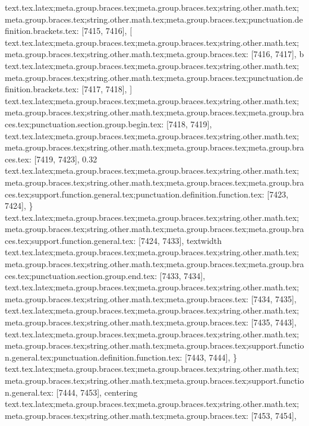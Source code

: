 {{{{{{{{{{{{{{{{{{{{{{{{{{{{{{{{{{{{{{{{{{{{{{{{{{{{{{{{{{{{{{{{{{{{{{{{{{{{{{{{{{{{{{{{{{{{{{{{{{{{{{{{{{{{{{{{{{{{{{{{{{{{{{{{{{{{{{{{{{{{{{{{{{{{{{{{{{{{{{{{{{{{{{{{{{{{{{{{{{{{{{{{{{{{{{{{{{{{{{{{text.tex.latex;meta.group.braces.tex;meta.group.braces.tex;string.other.math.tex;meta.group.braces.tex;string.other.math.tex;meta.group.braces.tex;punctuation.definition.brackets.tex: [7415, 7416], {[}
text.tex.latex;meta.group.braces.tex;meta.group.braces.tex;string.other.math.tex;meta.group.braces.tex;string.other.math.tex;meta.group.braces.tex: [7416, 7417], {b}
text.tex.latex;meta.group.braces.tex;meta.group.braces.tex;string.other.math.tex;meta.group.braces.tex;string.other.math.tex;meta.group.braces.tex;punctuation.definition.brackets.tex: [7417, 7418], {]}
text.tex.latex;meta.group.braces.tex;meta.group.braces.tex;string.other.math.tex;meta.group.braces.tex;string.other.math.tex;meta.group.braces.tex;meta.group.braces.tex;punctuation.section.group.begin.tex: [7418, 7419], {{}
text.tex.latex;meta.group.braces.tex;meta.group.braces.tex;string.other.math.tex;meta.group.braces.tex;string.other.math.tex;meta.group.braces.tex;meta.group.braces.tex: [7419, 7423], {0.32}
text.tex.latex;meta.group.braces.tex;meta.group.braces.tex;string.other.math.tex;meta.group.braces.tex;string.other.math.tex;meta.group.braces.tex;meta.group.braces.tex;support.function.general.tex;punctuation.definition.function.tex: [7423, 7424], {\}
text.tex.latex;meta.group.braces.tex;meta.group.braces.tex;string.other.math.tex;meta.group.braces.tex;string.other.math.tex;meta.group.braces.tex;meta.group.braces.tex;support.function.general.tex: [7424, 7433], {textwidth}
text.tex.latex;meta.group.braces.tex;meta.group.braces.tex;string.other.math.tex;meta.group.braces.tex;string.other.math.tex;meta.group.braces.tex;meta.group.braces.tex;punctuation.section.group.end.tex: [7433, 7434], {}}
text.tex.latex;meta.group.braces.tex;meta.group.braces.tex;string.other.math.tex;meta.group.braces.tex;string.other.math.tex;meta.group.braces.tex: [7434, 7435], {
}
text.tex.latex;meta.group.braces.tex;meta.group.braces.tex;string.other.math.tex;meta.group.braces.tex;string.other.math.tex;meta.group.braces.tex: [7435, 7443], {        }
text.tex.latex;meta.group.braces.tex;meta.group.braces.tex;string.other.math.tex;meta.group.braces.tex;string.other.math.tex;meta.group.braces.tex;support.function.general.tex;punctuation.definition.function.tex: [7443, 7444], {\}
text.tex.latex;meta.group.braces.tex;meta.group.braces.tex;string.other.math.tex;meta.group.braces.tex;string.other.math.tex;meta.group.braces.tex;support.function.general.tex: [7444, 7453], {centering}
text.tex.latex;meta.group.braces.tex;meta.group.braces.tex;string.other.math.tex;meta.group.braces.tex;string.other.math.tex;meta.group.braces.tex: [7453, 7454], { }
}}}}}}}}}}}}}}}}}}}}}}}}}}}}}}}}}}}}}}}}}}}}}}}}}}}}}}}}}}}}}}}}}}}}}}}}}}}}}}}}}}}}}}}}}}}}}}}}}}}}}}}}}}}}}}}}}}}}}}}}}}}}}}}}}}}}}}}}}}}}}}}}}}}}}}}}}}}}}}}}}}}}}}}}}}}}}}}}}}}}}}}}}}}}}}}}}}}}}}}}}}
